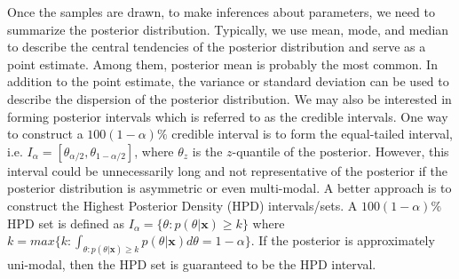 \documentclass[floatsintext, man]{apa7}
\begin{document}
Once the samples are drawn, to make inferences about parameters, we need to
summarize the posterior distribution. Typically, we use mean, mode, and median
to describe the central tendencies of the posterior distribution and serve as a
point estimate. Among them, posterior mean is probably the most common. In
addition to the point estimate, the variance or standard deviation can be used
to describe the dispersion of the posterior distribution. We may also be
interested in forming posterior intervals which is referred to as the credible
intervals.
One way to construct a $100(1-\alpha)\%$ credible interval is to form the
equal-tailed interval, i.e. $I_\alpha = [\theta_{\alpha/2}, \theta_
{1-\alpha/2}]$, where $\theta_z$ is the $z$-quantile of the posterior. However,
this interval could be unnecessarily long and not representative of the
posterior if the posterior distribution is asymmetric or even multi-modal.
A better approach is to construct the Highest Posterior Density (HPD)
intervals/sets. A $100(1-\alpha)\%$ HPD set is defined as $I_\alpha = \{\theta: p
(\theta|\bm{x}) \geq k\}$ where $k = max\{k:\int_{\theta:p(\theta|\bm{x})
\geq k} p(\theta|\bm{x})d\theta = 1 - \alpha\}$. If the posterior is
approximately uni-modal, then the HPD set is guaranteed to be the HPD interval.
\end{document}
